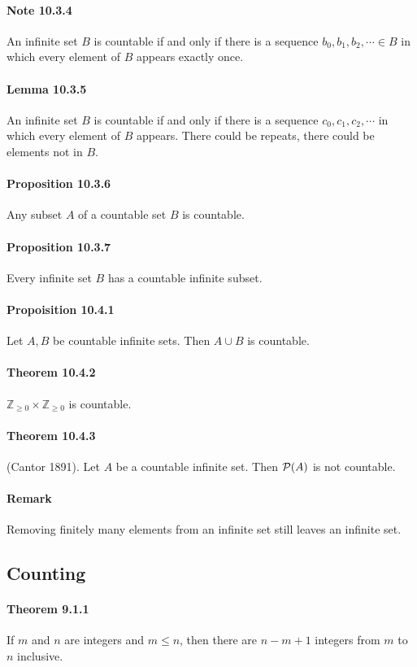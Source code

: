 \documentclass[a4paper]{article}
\newcommand{\Z}{\mathbb{Z}}
\begin{document}
\begin{multicols*}{3}
      \paragraph{Note 10.3.4} An infinite set $B$ is countable if and only if there is a sequence $b_0, b_1, b_2, \cdots \in B$ in which every element of $B$ appears exactly once.
      \paragraph{Lemma 10.3.5} An infinite set $B$ is countable if and only if there is a sequence $c_0, c_1, c_2, \cdots$ in which every element of $B$ appears. There could be repeats, there could be elements not in $B$.
      \paragraph{Proposition 10.3.6} Any subset $A$ of a countable set $B$ is countable.
      \paragraph{Proposition 10.3.7} Every infinite set $B$ has a countable infinite subset.
      \paragraph{Propoisition 10.4.1} Let $A,B$ be countable infinite sets. Then $A \cup B$ is countable.
      \paragraph{Theorem 10.4.2} $\Z_{\geq 0} \times \Z_{\geq 0}$ is countable.
      \paragraph{Theorem 10.4.3} (Cantor 1891). Let $A$ be a countable infinite set. Then $\mathcal{P}(A)$ is not countable.
      \paragraph{Remark} Removing finitely many elements from an infinite set still leaves an infinite set.
  \subsection*{Counting}
    \paragraph{Theorem 9.1.1} If $m$ and $n$ are integers and $m \leq n$, then there are $n-m+1$ integers from $m$ to $n$ inclusive.

\end{multicols*}
\end{document}
